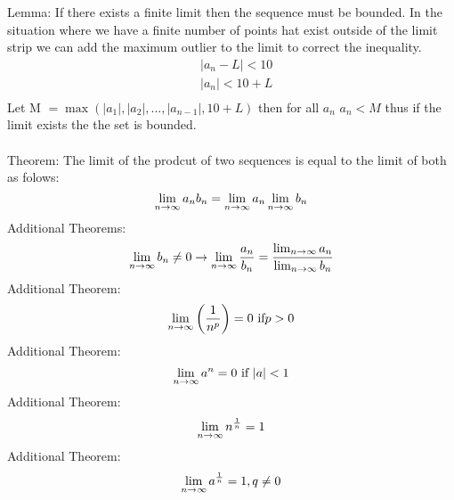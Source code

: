 \documentclass[11pt]{article}
\theoremstyle{definition}  %
\begin{document}
Lemma: If there exists a finite limit then the sequence must be bounded. In the situation where we have a finite number of points hat exist outside of the limit strip we can add the maximum outlier to the limit to correct the inequality. \\
\begin{align*}
  &|a_n-L|<10\\
  &|a_n|<10+L\\
\end{align*}
Let M $=\max(|a_1|,|a_2|,...,|a_{n-1}|,10+L)$ then for all $a_n $ $a_n<M $ thus if the limit exists the the set is bounded.\\\\
Theorem: The limit of the prodcut of two sequences is equal to the limit of both as folows:
\[
  \lim_{n\rightarrow\infty} a_nb_n=\lim_{n\rightarrow\infty} a_n\lim_{n\rightarrow\infty} b_n
\]
Additional Theorems:
\[
  \lim_{n\rightarrow\infty} b_n \neq 0 \rightarrow \lim_{n\rightarrow\infty} \frac{a_n}{b_n}=\frac{\lim_{n\rightarrow\infty} a_n}{\lim_{n\rightarrow\infty} b_n}
\]
Additional Theorem:
\[
  \lim_{n\rightarrow\infty} \left(\frac{1}{n^p}\right)=0 \text{ if}  p>0
\]
Additional Theorem:
\[
  \lim_{n\rightarrow\infty} a^n=0 \text{ if } |a|<1
\]
Additional Theorem:
\[
  \lim_{n\rightarrow\infty} n^{\frac{1}{n}}=1
\]
Additional Theorem:
\[
  \lim_{n\rightarrow\infty} a^{\frac{1}{n}}=1, q\neq 0
\]
\end{document}
